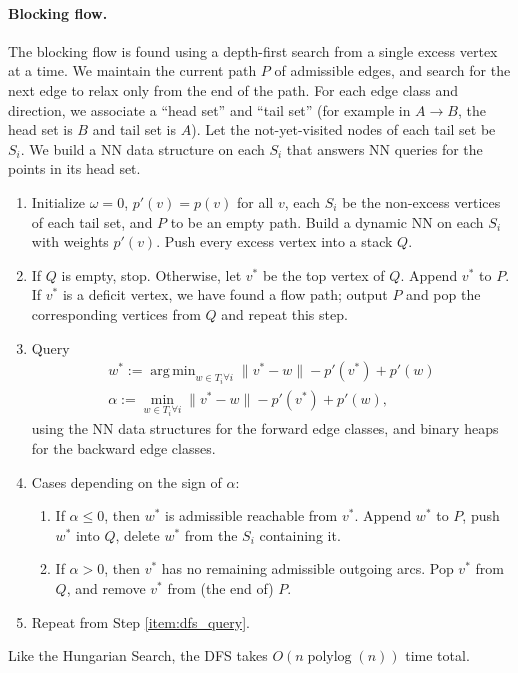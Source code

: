 \documentclass[11pt]{article}
\def\polylog{\mathop{\mathrm{polylog}}}
\DeclareMathOperator*{\argmin}{arg\,min}
\theoremstyle{plain}
\begin{document}
\paragraph{Blocking flow.}
The blocking flow is found using a depth-first search from a single excess vertex at a time.
We maintain the current path $P$ of admissible edges,
and search for the next edge to relax only from the end of the path.
For each edge class and direction, we associate a ``head set'' and ``tail set''
(for example in $A \to B$, the head set is $B$ and tail set is $A$).
Let the not-yet-visited nodes of each tail set be $S_i$. 
We build a NN data structure on each $S_i$ that answers NN queries for the points in its head set.
\begin{enumerate}
\item Initialize $\omega = 0$, $p'(v) = p(v)$ for all $v$, 
	each $S_i$ be the non-excess vertices of each tail set,
	and $P$ to be an empty path.
	Build a dynamic NN on each $S_i$ with weights $p'(v)$.
	Push every excess vertex into a stack $Q$.
\item \label{item:dfs_query}
	If $Q$ is empty, stop.
	Otherwise, let $v^*$ be the top vertex of $Q$. Append $v^*$ to $P$.
	If $v^*$ is a deficit vertex, we have found a flow path;
	output $P$ and pop the corresponding vertices from $Q$ and repeat this step.
\item Query
	\begin{gather*}
		w^* := \argmin_{w \in T_i \forall i} \|v^* - w\| - p'(v^*) + p'(w) \\
		\alpha := \min_{w \in T_i \forall i} \|v^* - w\| - p'(v^*) + p'(w),
	\end{gather*}
	using the NN data structures for the forward edge classes, 
	and binary heaps for the backward edge classes.
\item Cases depending on the sign of $\alpha$:
	\begin{enumerate}
	\item If $\alpha \leq 0$, 
		then $w^*$ is admissible reachable from $v^*$.
		Append $w^*$ to $P$, push $w^*$ into $Q$,
		delete $w^*$ from the $S_i$ containing it.
	\item If $\alpha > 0$,
		then $v^*$ has no remaining admissible outgoing arcs.
		Pop $v^*$ from $Q$, and remove $v^*$ from (the end of) $P$.
	\end{enumerate}
\item Repeat from Step \ref{item:dfs_query}.
\end{enumerate}
Like the Hungarian Search, the DFS takes $O(n\polylog(n))$ time total.
\end{document}
